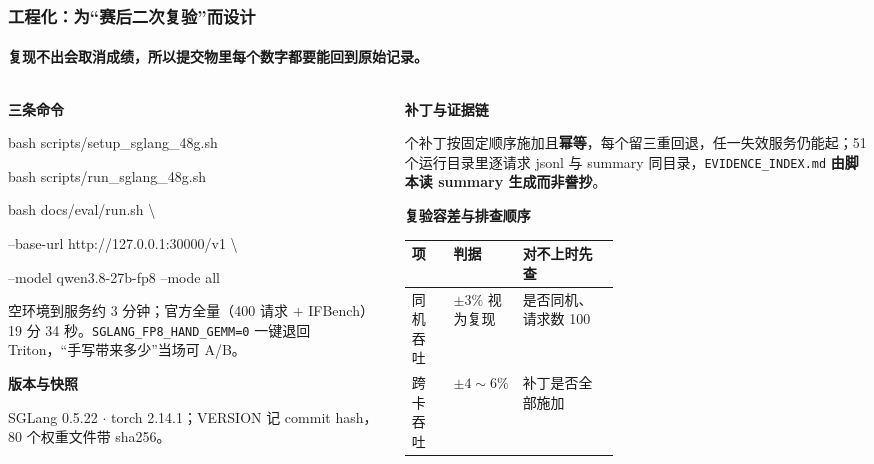\documentclass[aspectratio=169,10pt,UTF8]{beamer}
\newcommand{\hd}[2][9.8]{\par{\sffamily\bfseries\fontsize{#1}{11.2}\selectfont #2}\par
  \vspace{1pt}\noindent{\color{rule}\rule{\linewidth}{0.4pt}}\par\vspace{2.4pt}}
\newcommand{\body}[1]{\par{\fontsize{8.7}{11.3}\selectfont #1}\par}
\renewcommand{\arraystretch}{1.0}
\begin{document}
\begin{frame}[t]
  \frametitle{工程化：为“赛后二次复验”而设计}
  \framesubtitle{复现不出会取消成绩，所以提交物里每个数字都要能回到原始记录。}

  \begin{columns}[T,onlytextwidth]
    \begin{column}{0.365\linewidth}
      \hd{三条命令}
      {\ttfamily\fontsize{7.2}{10.4}\selectfont
      bash scripts/setup\_sglang\_48g.sh\par
      bash scripts/run\_sglang\_48g.sh\par
      bash docs/eval/run.sh \textbackslash\par
      \hspace*{0.5em}--base-url http://127.0.0.1:30000/v1 \textbackslash\par
      \hspace*{0.5em}--model qwen3.8-27b-fp8 --mode all\par}
      \vspace{4pt}
      \body{空环境到服务约 3 分钟；官方全量（400 请求 $+$ IFBench）19 分 34 秒。\texttt{SGLANG\_FP8\_HAND\_GEMM=0} 一键退回 Triton，“手写带来多少”当场可 A/B。\par}
      \vspace{4pt}
      \hd{版本与快照}
      \body{SGLang 0.5.22 $\cdot$ torch 2.14.1；VERSION 记 commit hash，80 个权重文件带 sha256。\par}
    \end{column}
    \hfill
    \begin{column}{0.585\linewidth}
      \hd{补丁与证据链}
      \body{7 个补丁按固定顺序施加且\textbf{幂等}，每个留三重回退，任一失效服务仍能起；51 个运行目录里逐请求 jsonl 与 summary 同目录，\texttt{EVIDENCE\_INDEX.md} \textbf{由脚本读 summary 生成而非誊抄}。\par}
      \vspace{4pt}
      \hd{复验容差与排查顺序}
      {\fontsize{8.1}{10.2}\selectfont
      \renewcommand{\arraystretch}{1.0}
      \begin{tabularx}{\linewidth}{@{}>{\raggedright\arraybackslash}p{0.20\linewidth} >{\raggedright\arraybackslash}p{0.25\linewidth} X@{}}
        \toprule
        \textbf{项} & \textbf{判据} & \textbf{对不上时先查} \\
        \midrule
        同机吞吐 & $\pm3\%$ 视为复现 & 是否同机、请求数 100 \\
        跨卡吞吐 & $\pm4\sim6\%$ & 补丁是否全部施加 \\

\end{tabularx}}
\end{column}
\end{columns}
\end{frame}
\end{document}
